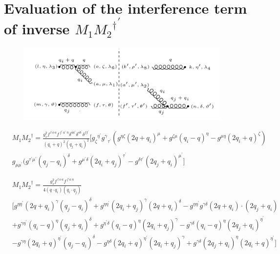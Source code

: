 \section*{Evaluation of the interference term of inverse ${M_1{M_2}^{\dagger}}^{\prime}$}

\label{EvaIntInvGG}
\begin{figure}[h!]
\centering
\includegraphics[width=0.95\textwidth]{images/GG/M1DaggerggInverse.png}
\end{figure}


\begin{equation}
\begin{split}
&M_1{M_2}^{\dagger}=\frac{g_s^2 f^{\:l\:o\:a} f^{\:f^{\prime}\: a^{\prime}\:n} \delta^{aa^{\prime}} \delta^{ob^{\prime}} \delta^{ff^{\prime}}}{(q_i +q)^2 (q_j +q_i)^2}
[{g_{{\zeta}}}^{{\eta}^{\prime}} {g^{\gamma}}_{{\tau}^{\prime}}(g^{{\eta}{\zeta}}(2q+q_i)^{\mu}+g^{{\zeta}{\mu}}(q_i -q)^{\eta}-g^{{\mu}{\eta}}(2q_i +q)^{\zeta})\\
&g_{{{\mu}}{{\mu}^{\prime}}}(g^{{{\tau}^{\prime}}{{\mu}^{\prime}}}(q_j-q_i)^{{\delta}}+g^{{{\mu}^{\prime}}{{\delta}}}(2q_i +q_j)^{{\tau}^{\prime}}-g^{{{\delta}}{{\tau}^{\prime}}}(2q_j+q_i)^{{\mu}^{\prime}}]
\end{split}
\end{equation}


\begin{equation}
\begin{split}
&M_1{M_2}^{\dagger}=\frac{g_s^2 f^{\:l\:o\:a} f^{\:f\: a\:n}}{4(q\cdot q_i) (q_i \cdot q_j)}\\
&[g^{{{\eta}}{{\eta}^{\prime}}}(2q+q_i)^{\gamma}(q_j-q_i)^{{\delta}}+g^{{{\eta}}{{\eta}^{\prime}}}(2q_i +q_j)^{\gamma}(2q+q_i)^{{\delta}}-g^{{{\eta}}{{\eta}^{\prime}}}g^{{{\gamma}}{{\delta}}}(2q+q_i)\cdot (2q_j+q_i)\\
&+g^{{{\gamma}}{{\eta}^{\prime}}}(q_i -q)^{\eta}(q_j+q_i)^{{\delta}}+g^{{{\eta}^{\prime}}{{\delta}}}(q_i -q)^{\eta}(2q_i +q_j)^{{\gamma}}
-g^{{{\gamma}}{{\delta}}}(q_i -q)^{\eta}(2q_j+q_i)^{{\eta}^{\prime}}\\
&-g^{{{\gamma}}{{\eta}}}(2q_i +q)^{{\eta}^{\prime}}(q_j-q_i)^{{\delta}}
-g^{{{\eta}}{{\delta}}}(2q_i +q)^{{\eta}^{\prime}}(2q_i +q_j)^{{\gamma}}
+g^{{{\gamma}}{{\delta}}}(2q_j+q_i)^{{\eta}}(2q_i +q)^{{\eta}^{\prime}}]\\
\end{split}
\end{equation}

